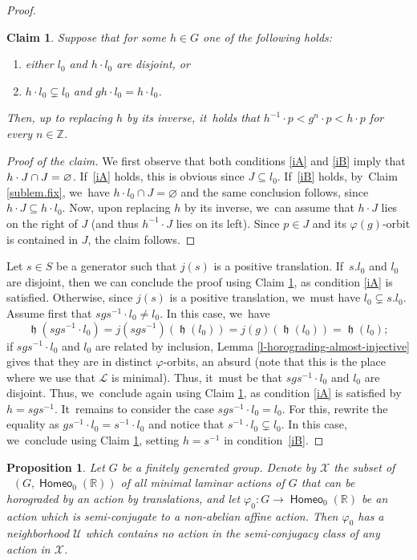 \documentclass[JEP,XML,SOM,Unicode,NoFloatCountersInSection,published]{cedram}
\newtheorem{claimnum}{Claim}
\newtheorem{prop}[thm]{Proposition}
\theoremstyle{definition}
\DeclareMathOperator{\homeo}{\mathsf{Homeo}}
\DeclareMathOperator{\Homirr}{\mathsf{Hom}_{\mathrm{irr}}}
\DeclareMathOperator{\hor}{\mathfrak{h}}
\newcommand{\R}{\mathbb{R}}
\newcommand{\Z}{\mathbb Z}
\begin{document}
\begin{proof}
\begin{claimnum}\label{sublem.related}
Suppose that for some $h\in G$ one of the following holds:
\begin{enumerate}
\item\label{iA} either $l_0$ and $h\cdot l_0$ are disjoint, or
\item\label{iB} $h\cdot l_0\subsetneq l_0$ and $gh\cdot l_0=h\cdot l_0$.
\end{enumerate}
Then, up to replacing $h$ by its inverse, it~holds that $h^{-1}\cdot p<g^n\cdot p<h\cdot p$ for every $n\in\Z$.
\end{claimnum}
\begin{proof}[Proof of the claim]
We first observe that both conditions \eqref{iA} and \eqref{iB} imply that $h\cdot J\cap\nobreak J=\varnothing$. If~\eqref{iA} holds, this is obvious since $J\subseteq l_0$. If~\eqref{iB} holds, by~Claim \ref{sublem.fix}, we~have $h\cdot l_0\cap {J}=\varnothing$ and the same conclusion follows, since $h\cdot J\subseteq h\cdot l_0$. Now, upon replacing $h$ by its inverse, we~can assume that $h\cdot J$ lies on the right of $J$ (and thus $h^{-1}\cdot J$ lies on its left). Since $p\in J$ and its $\varphi(g)$-orbit is contained in $J$, the claim follows.
\end{proof}

Let $s\in S$ be a generator such that $j(s)$ is a positive translation. If~$s.l_0$ and $l_0$ are disjoint, then we can conclude the proof using Claim \ref{sublem.related}, as condition \eqref{iA} is satisfied. Otherwise, since $j(s)$ is a positive translation, we~must have $l_0\subsetneq s.l_0$.
Assume first that $sgs^{-1}\cdot l_0\neq l_0$. In this case, we~have
\[
\hor(sgs^{-1}\cdot l_0)=j(sgs^{-1})(\hor(l_0))=j(g)(\hor(l_0))=\hor(l_0);
\]
if $sgs^{-1}\cdot l_0$ and $l_0$ are related by inclusion, Lemma \ref{l-horograding-almost-injective} gives that they are in distinct $\varphi$-orbits, an absurd (note that this is the place where we use that $\mathcal L$ is minimal). Thus, it~must be that $sgs^{-1}\cdot l_0$ and $l_0$ are disjoint. Thus, we~conclude again using Claim \ref{sublem.related}, as condition \eqref{iA} is satisfied by $h=sgs^{-1}$. It~remains to consider the case $sgs^{-1}\cdot l_0=l_0$. For this, rewrite the equality as $gs^{-1}\cdot l_0=s^{-1}\cdot l_0$ and notice that $s^{-1}\cdot l_0\subsetneq l_0$. In this case, we~conclude using Claim \ref{sublem.related}, setting $h=s^{-1}$ in condition~\eqref{iB}.
\end{proof}

\begin{prop}\label{prop.focal_away}
Let $G$ be a finitely generated group. Denote by $\mathcal{X}$ the subset of $\Homirr(G, \homeo_0(\R))$ of all minimal laminar actions of $G$ that can be horograded by an action by translations, and let $\varphi_0\colon G\to \homeo_0(\R)$ be an action which is semi-conjugate to a non-abelian affine action. Then $\varphi_0$ has a neighborhood $\mathcal{U}$ which contains no action in the semi-conjugacy class of any action in $\mathcal X$.
\end{prop}
\end{document}
